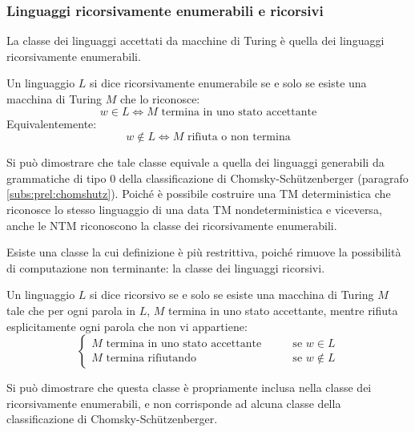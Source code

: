 \subsubsection{Linguaggi ricorsivamente enumerabili e ricorsivi}
La classe dei linguaggi accettati da macchine di Turing è quella dei linguaggi ricorsivamente enumerabili.
\begin{defin}
	Un linguaggio $L$ si dice ricorsivamente enumerabile se e solo se esiste una macchina di Turing $M$ che lo riconosce:
	\begin{equation*}
		w\in L \iff M \text{ termina in uno stato accettante}
	\end{equation*}
	Equivalentemente:
	\begin{equation*}
		w\notin L \iff M \text{ rifiuta o non termina}
	\end{equation*}
\end{defin}
Si può dimostrare che tale classe equivale a quella dei linguaggi generabili da grammatiche di tipo 0 della classificazione di Chomsky-Schützenberger (paragrafo \ref{subs:prel:chomshutz}). Poiché è possibile costruire una TM deterministica che riconosce lo stesso linguaggio di una data TM nondeterministica e viceversa, anche le NTM riconoscono la classe dei ricorsivamente enumerabili.

Esiste una classe la cui definizione è più restrittiva, poiché rimuove la possibilità di computazione non terminante: la classe dei linguaggi ricorsivi.
\begin{defin}
	Un linguaggio $L$ si dice ricorsivo se e solo se esiste una macchina di Turing $M$ tale che per ogni parola in $L$, $M$ termina in uno stato accettante, mentre rifiuta esplicitamente ogni parola che non vi appartiene:
	\begin{equation*}
		\begin{cases}
			\text{$M$ termina in uno stato accettante} \qquad&\text{se } w\in L \\
			\text{$M$ termina rifiutando} \qquad&\text{se } w\notin L
		\end{cases}
	\end{equation*}
\end{defin}
Si può dimostrare che questa classe è propriamente inclusa nella classe dei ricorsivamente enumerabili, e non corrisponde ad alcuna classe della classificazione di Chomsky-Schützenberger.



